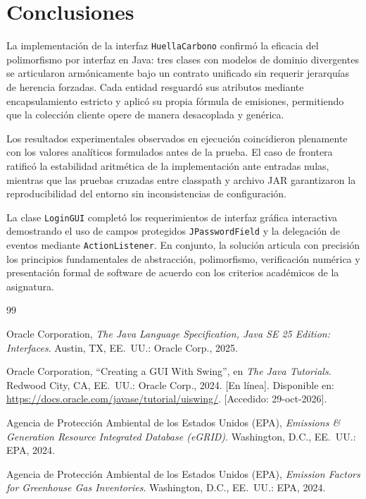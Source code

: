 \documentclass[letterpaper,12pt,oneside]{article}
\numberwithin{figure}{section}
\renewcommand{\refname}{Bibliograf\'ia}
\begin{document}
\clearpage
\section{Conclusiones}

La implementaci\'on de la interfaz \texttt{HuellaCarbono} confirm\'o la eficacia del polimorfismo por interfaz en Java: tres clases con modelos de dominio divergentes se articularon arm\'onicamente bajo un contrato unificado sin requerir jerarqu\'ias de herencia forzadas. Cada entidad resguard\'o sus atributos mediante encapsulamiento estricto y aplic\'o su propia f\'ormula de emisiones, permitiendo que la colecci\'on cliente opere de manera desacoplada y gen\'erica.

Los resultados experimentales observados en ejecuci\'on coincidieron plenamente con los valores anal\'iticos formulados antes de la prueba. El caso de frontera ratific\'o la estabilidad aritm\'etica de la implementaci\'on ante entradas nulas, mientras que las pruebas cruzadas entre classpath y archivo JAR garantizaron la reproducibilidad del entorno sin inconsistencias de configuraci\'on.

La clase \texttt{LoginGUI} complet\'o los requerimientos de interfaz gr\'afica interactiva demostrando el uso de campos protegidos \texttt{JPasswordField} y la delegaci\'on de eventos mediante \texttt{ActionListener}. En conjunto, la soluci\'on articula con precisi\'on los principios fundamentales de abstracci\'on, polimorfismo, verificaci\'on num\'erica y presentaci\'on formal de software de acuerdo con los criterios acad\'emicos de la asignatura.

\clearpage
\renewcommand{\refname}{Bibliograf\'ia}
\begin{thebibliography}{99}

Oracle Corporation, \emph{The Java Language Specification, Java SE 25 Edition: Interfaces}. Austin, TX, EE.~UU.: Oracle Corp., 2025.

Oracle Corporation, ``Creating a GUI With Swing'', en \emph{The Java Tutorials}. Redwood City, CA, EE.~UU.: Oracle Corp., 2024. [En l\'inea]. Disponible en: \url{https://docs.oracle.com/javase/tutorial/uiswing/}. [Accedido: 29-oct-2026].

Agencia de Protecci\'on Ambiental de los Estados Unidos (EPA), \emph{Emissions \& Generation Resource Integrated Database (eGRID)}. Washington, D.C., EE.~UU.: EPA, 2024.

Agencia de Protecci\'on Ambiental de los Estados Unidos (EPA), \emph{Emission Factors for Greenhouse Gas Inventories}. Washington, D.C., EE.~UU.: EPA, 2024.

\end{thebibliography}
\end{document}
